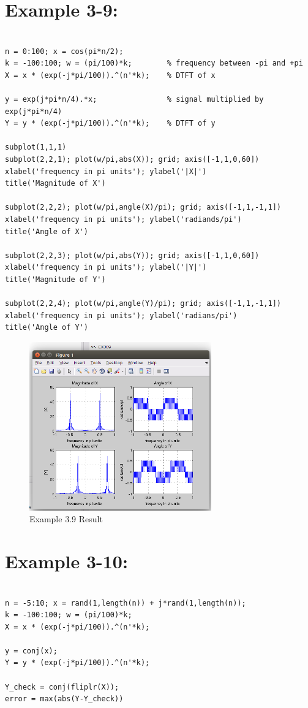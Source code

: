 \documentclass[11pt
  , a4paper
  , article
  , oneside
]{memoir}
\begin{document}
\chapter{Example 3-9:}
\begin{lstlisting}[style=termstyle]
%Example 3.9

n = 0:100; x = cos(pi*n/2);
k = -100:100; w = (pi/100)*k;        % frequency between -pi and +pi
X = x * (exp(-j*pi/100)).^(n'*k);    % DTFT of x

y = exp(j*pi*n/4).*x;                % signal multiplied by exp(j*pi*n/4)
Y = y * (exp(-j*pi/100)).^(n'*k);    % DTFT of y

subplot(1,1,1)
subplot(2,2,1); plot(w/pi,abs(X)); grid; axis([-1,1,0,60])
xlabel('frequency in pi units'); ylabel('|X|')
title('Magnitude of X')

subplot(2,2,2); plot(w/pi,angle(X)/pi); grid; axis([-1,1,-1,1])
xlabel('frequency in pi units'); ylabel('radiands/pi')
title('Angle of X')

subplot(2,2,3); plot(w/pi,abs(Y)); grid; axis([-1,1,0,60])
xlabel('frequency in pi units'); ylabel('|Y|')
title('Magnitude of Y')

subplot(2,2,4); plot(w/pi,angle(Y)/pi); grid; axis([-1,1,-1,1])
xlabel('frequency in pi units'); ylabel('radians/pi')
title('Angle of Y')
\end{lstlisting}

\begin{figure}[h!]
	\centering
	\includegraphics[width=0.7\textwidth,height=0.5\textwidth]{./images/Ex3-9.png}
	\caption{Example 3.9 Result}
	\label{fig:Example 3-9 Result}
\end{figure}

\clearpage

\chapter{Example 3-10:}
\begin{lstlisting}[style=termstyle]
%Example 3.10

n = -5:10; x = rand(1,length(n)) + j*rand(1,length(n));
k = -100:100; w = (pi/100)*k;        
X = x * (exp(-j*pi/100)).^(n'*k);    

y = conj(x);                         
Y = y * (exp(-j*pi/100)).^(n'*k);    

Y_check = conj(fliplr(X));           
error = max(abs(Y-Y_check))  
\end{lstlisting}
\end{document}
